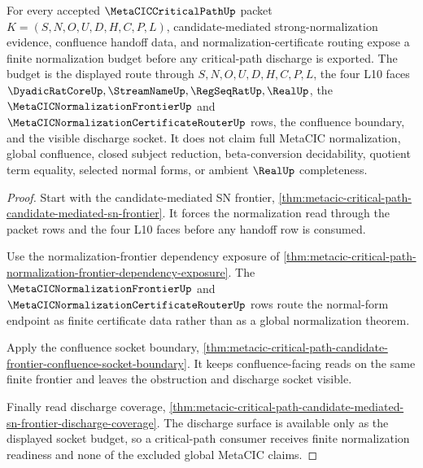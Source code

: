 \begin{theorem}
\label{thm:metacic-critical-path-candidate-mediated-normalization-budget}
For every accepted $\MetaCICCriticalPathUp$ packet $K=(S,N,O,U,D,H,C,P,L)$, candidate-mediated strong-normalization evidence, confluence handoff data, and normalization-certificate routing expose a finite normalization budget before any critical-path discharge is exported. The budget is the displayed route through $S,N,O,U,D,H,C,P,L$, the four L10 faces $\DyadicRatCoreUp,\StreamNameUp,\RegSeqRatUp,\RealUp$, the $\MetaCICNormalizationFrontierUp$ and $\MetaCICNormalizationCertificateRouterUp$ rows, the confluence boundary, and the visible discharge socket. It does not claim full MetaCIC normalization, global confluence, closed subject reduction, beta-conversion decidability, quotient term equality, selected normal forms, or ambient $\RealUp$ completeness.
\end{theorem}
\begin{proof}
Start with the candidate-mediated SN frontier, \autoref{thm:metacic-critical-path-candidate-mediated-sn-frontier}. It forces the normalization read through the packet rows and the four L10 faces before any handoff row is consumed.

Use the normalization-frontier dependency exposure of \autoref{thm:metacic-critical-path-normalization-frontier-dependency-exposure}. The $\MetaCICNormalizationFrontierUp$ and $\MetaCICNormalizationCertificateRouterUp$ rows route the normal-form endpoint as finite certificate data rather than as a global normalization theorem.

Apply the confluence socket boundary, \autoref{thm:metacic-critical-path-candidate-frontier-confluence-socket-boundary}. It keeps confluence-facing reads on the same finite frontier and leaves the obstruction and discharge socket visible.

Finally read discharge coverage, \autoref{thm:metacic-critical-path-candidate-mediated-sn-frontier-discharge-coverage}. The discharge surface is available only as the displayed socket budget, so a critical-path consumer receives finite normalization readiness and none of the excluded global MetaCIC claims.
\end{proof}
